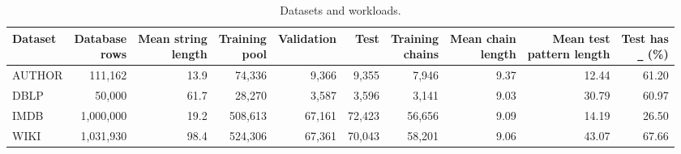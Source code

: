 \begin{table}[t]
\centering
\small
\setlength{\tabcolsep}{3pt}
\caption{Datasets and workloads.}
\label{tab:workloads}
\begin{tabular*}{\textwidth}{@{\extracolsep{\fill}}lrrrrrrrrr@{}}
\toprule
Dataset & \shortstack{Database\\rows} & \shortstack{Mean string\\length} & \shortstack{Training\\pool} & Validation & Test & \shortstack{Training\\chains} & \shortstack{Mean chain\\length} & \shortstack{Mean test\\pattern length} & \shortstack{Test has\\\texttt{\_} (\%)} \\
\midrule
AUTHOR & 111,162 & 13.9 & 74,336 & 9,366 & 9,355 & 7,946 & 9.37 & 12.44 & 61.20 \\
DBLP & 50,000 & 61.7 & 28,270 & 3,587 & 3,596 & 3,141 & 9.03 & 30.79 & 60.97 \\
IMDB & 1,000,000 & 19.2 & 508,613 & 67,161 & 72,423 & 56,656 & 9.09 & 14.19 & 26.50 \\
WIKI & 1,031,930 & 98.4 & 524,306 & 67,361 & 70,043 & 58,201 & 9.06 & 43.07 & 67.66 \\
\bottomrule
\end{tabular*}
\end{table}

